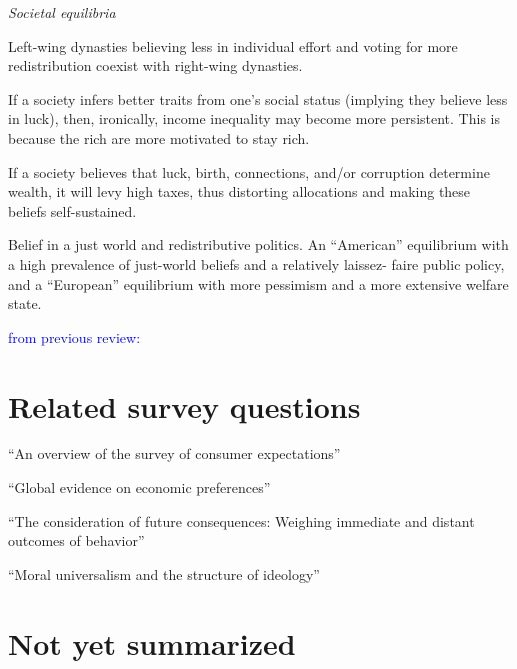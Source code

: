 \documentclass{article}
\newcommand{\blue}[1]{\textcolor{blue}{#1}}
\newcommand{\citem}[1]{\medskip \noindent \textbf{\cite*{#1}}}
\newcommand{\textm}[1]{\medskip \noindent \textit{#1}}
\begin{document}
\textm{Societal equilibria}

\citem{piketty1995social}

Left-wing dynasties believing less in individual effort and voting for more
redistribution coexist with right-wing dynasties. 

\citem{piketty1998self}

If a society infers better traits from one’s social status (implying they believe less in luck), then, ironically, income inequality may become more persistent. This is because the rich are more motivated to stay rich.

\citem{alesina2005fairness}

If a society believes that luck, birth, connections, and/or corruption determine wealth, it will levy high taxes, thus distorting allocations and making these beliefs self-sustained.

\citem{benabou2006belief}

Belief in a just world and redistributive politics. An “American” equilibrium with a high prevalence of just-world beliefs and a relatively laissez- faire public policy, and a “European” equilibrium with more pessimism and a more extensive welfare state.










\newpage \noindent \blue{from previous review:}

\section*{Related survey questions}

\noindent \textbf{\cite{armantier2017overview}} ``An overview of the survey of consumer expectations''

\medskip \noindent \textbf{\cite{falk2018global}} ``Global evidence on economic preferences''

\medskip \noindent \textbf{\cite{strathman1994consideration}} ``The consideration of future consequences: Weighing immediate and distant outcomes of behavior''

\medskip \noindent \textbf{\cite{enke2023moral}} ``Moral universalism and the structure of ideology''




\section*{Not yet summarized}
\end{document}
